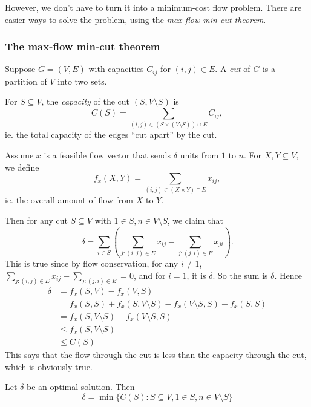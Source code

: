 \documentclass[a4paper]{article}
\begin{document}
However, we don't have to turn it into a minimum-cost flow problem. There are easier ways to solve the problem, using the \emph{max-flow min-cut theorem}.

\subsubsection{The max-flow min-cut theorem}

\begin{defi}[Cut]
  Suppose $G = (V, E)$ with capacities $C_{ij}$ for $(i, j)\in E$. A \emph{cut} of $G$ is a partition of $V$ into two sets.

  For $S\subseteq V$, the \emph{capacity} of the cut $(S, V\setminus S)$ is
  \[
    C(S) = \sum_{(i, j)\in (S\times (V\setminus S))\cap E}C_{ij},
  \]
  ie. the total capacity of the edges ``cut apart'' by the cut.
\end{defi}

Assume $x$ is a feasible flow vector that sends $\delta$ units from $1$ to $n$. For $X, Y\subseteq V$, we define
\[
  f_x(X, Y) = \sum_{(i, j)\in (X\times Y)\cap E}x_{ij},
\]
ie. the overall amount of flow from $X$ to $Y$.

Then for any cut $S\subseteq V$ with $1\in S, n\in V\setminus S$, we claim that
\[
  \delta = \sum_{i\in S}\left(\sum_{j: (i, j)\in E}x_{ij} - \sum_{j: (j, i)\in E}x_{ji}\right).
\]
This is true since by flow conservation, for any $i \not= 1$, $\sum_{j: (i, j) \in E}x_{ij} - \sum_{j: (j, i)\in E} = 0$, and for $i = 1$, it is $\delta$. So the sum is $\delta$. Hence
\begin{align*}
  \delta &= f_x(S, V) - f_x(V, S)\\
  &= f_x(S, S) + f_x(S, V\setminus S) - f_x(V\setminus S, S) - f_x(S, S)\\
  &= f_x(S, V\setminus S) - f_x(V\setminus S, S)\\
  &\leq f_x(S, V\setminus S)\\
  &\leq C(S)
\end{align*}
This says that the flow through the cut is less than the capacity through the cut, which is obviously true.

\begin{thm}
  Let $\delta$ be an optimal solution. Then
  \[
    \delta = \min\{C(S): S\subseteq V, 1\in S, n \in V\setminus S\}
  \]
\end{thm}
\end{document}
